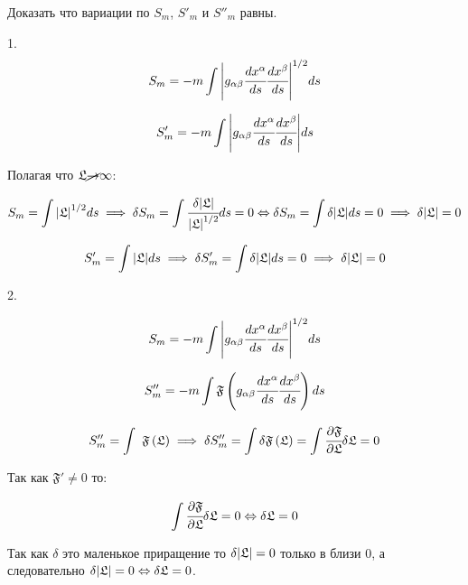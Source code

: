 \documentclass[a4paper]{article}
\newcommand{\inner}[1]{\left( #1 \right)}
\renewcommand{\div}[2]{\cfrac{d #1}{d #2}}
\newcommand{\piv}[2]{\cfrac{\partial #1}{\partial #2}}
\numberwithin{equation}{section}
\begin{document}
\oddsidemargin=-0.5in
\topmargin=-0.5in
\pagestyle{plain}

Доказать что вариации по $S_m$, $S'_m$ и $S''_m$ равны.

1.
\begin{equation}
    S_m = -m \int \abs{g_{\alpha \beta} \div{x^{\alpha}}{s}\div{x^{\beta}}{s} }^{1/2} ds
\end{equation}

\begin{equation}
    S'_m = -m \int \abs{g_{\alpha \beta} \div{x^{\alpha}}{s}\div{x^{\beta}}{s} }ds
\end{equation}


Полагая что $\mathfrak L \cancel{\to} \infty$:

\begin{equation}
    S_m = \int \abs{\mathfrak L}^{1/2} ds \implies 
    \delta S_m = \int  \cfrac{\delta \abs{\mathfrak L}}{\abs{\mathfrak L}^{1/2}} ds = 0 
    \Leftrightarrow \delta S_m = \int \delta \abs{\mathfrak L} ds = 0 \implies 
    \delta \abs{\mathfrak L} = 0 
\end{equation}

\begin{equation}
    S'_m = \int \abs{\mathfrak L}ds \implies \delta  S'_m = \int \delta \abs{\mathfrak L}ds = 0
    \implies \delta \abs{\mathfrak L} = 0
\end{equation}

2.

\begin{equation}
    S_m = -m \int \abs{g_{\alpha \beta} \div{x^{\alpha}}{s}\div{x^{\beta}}{s} }^{1/2} ds
\end{equation}

\begin{equation}
    S''_m = -m \int \mathfrak F \inner{g_{\alpha \beta} \div{x^{\alpha}}{s}\div{x^{\beta}}{s} }ds
\end{equation}



\begin{equation}
    S''_m = \int \ \mathfrak F \inner{\mathfrak L} \implies
    \delta S''_m = \int \delta \mathfrak F \inner{\mathfrak L} =
    \int \piv{\mathfrak F}{\mathfrak L} \delta \mathfrak L = 0
\end{equation}

Так как $\mathfrak F ' \neq 0$ то:

\begin{equation}
    \int \piv{\mathfrak F}{\mathfrak L} \delta \mathfrak L = 0 \Leftrightarrow 
    \delta \mathfrak L = 0
\end{equation}

Так как $\delta$ это маленькое приращение то $\delta \abs{\mathfrak L} = 0$ 
только в близи 0, а следовательно 
$\delta \abs{\mathfrak L} = 0 \Leftrightarrow \delta \mathfrak L = 0$.
\end{document}
